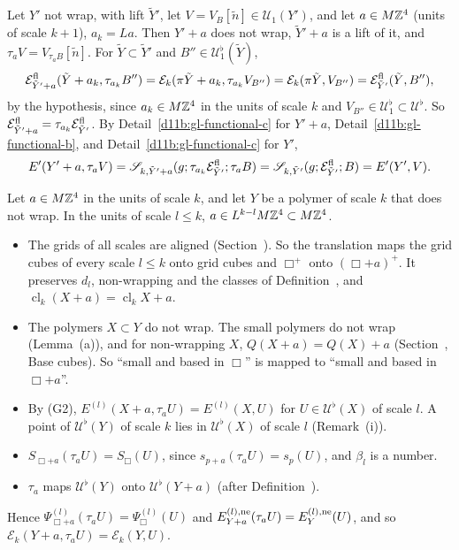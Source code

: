 \begin{step}
Let $Y'$ not wrap, with lift $\tilde Y'$, let $V=V_B[\tilde n]\in\mathcal U_1(Y')$, and let $a\in M\mathbb Z^4$ (units of scale $k+1$), $a_k=La$. Then $Y'+a$ does not wrap, $\tilde Y'+a$ is a lift of it, and $\tau_aV=V_{\tau_aB}[\tilde n]$. For $\tilde Y\subset\tilde Y'$ and $B''\in\mathcal U^\flat_1(\tilde Y)$,
\[
\mathcal E^{\rm fl}_{\tilde Y'+a}(\tilde Y+a_k,\tau_{a_k}B'')=\mathcal E_k(\pi\tilde Y+a_k,\tau_{a_k}V_{B''})=\mathcal E_k(\pi\tilde Y,V_{B''})=\mathcal E^{\rm fl}_{\tilde Y'}(\tilde Y,B''),
\]
by the hypothesis, since $a_k\in M\mathbb Z^4$ in the units of scale $k$ and $V_{B''}\in\mathcal U^\flat_1\subset\mathcal U^\flat$. So $\mathcal E^{\rm fl}_{\tilde Y'+a}=\tau_{a_k}\mathcal E^{\rm fl}_{\tilde Y'}$. By Detail~\ref{d11b:gl-functional-c} for $Y'+a$, Detail~\ref{d11b:gl-functional-b}, and Detail~\ref{d11b:gl-functional-c} for $Y'$,
\[
E'(Y'+a,\tau_aV)=\mathscr S_{k,\tilde Y'+a}(g;\tau_{a_k}\mathcal E^{\rm fl}_{\tilde Y'};\tau_aB)=\mathscr S_{k,\tilde Y'}(g;\mathcal E^{\rm fl}_{\tilde Y'};B)=E'(Y',V).
\]
\end{step}

\begin{step}
Let $a\in M\mathbb Z^4$ in the units of scale $k$, and let $Y$ be a polymer of scale $k$ that does not wrap. In the units of scale $l\le k$, $a\in L^{k-l}M\mathbb Z^4\subset M\mathbb Z^4$.
\begin{itemize}
\item The grids of all scales are aligned (Section~). So the translation maps the grid cubes of every scale $l\le k$ onto grid cubes and $\Box^+$ onto $(\Box+a)^+$. It preserves $d_l$, non-wrapping and the classes of Definition~, and $\operatorname{cl}_k(X+a)=\operatorname{cl}_kX+a$.
\item The polymers $X\subset Y$ do not wrap. The small polymers do not wrap (Lemma~(a)), and for non-wrapping $X$, $Q(X+a)=Q(X)+a$ (Section~, Base cubes). So ``small and based in $\Box$'' is mapped to ``small and based in $\Box+a$''.
\item By (G2), $E^{(l)}(X+a,\tau_aU)=E^{(l)}(X,U)$ for $U\in\mathcal U^\flat(X)$ of scale $l$. A point of $\mathcal U^\flat(Y)$ of scale $k$ lies in $\mathcal U^\flat(X)$ of scale $l$ (Remark~(i)).
\item $S_{\Box+a}(\tau_aU)=S_\Box(U)$, since $s_{p+a}(\tau_aU)=s_p(U)$, and $\beta_l$ is a number.
\item $\tau_a$ maps $\mathcal U^\flat(Y)$ onto $\mathcal U^\flat(Y+a)$ (after Definition~).
\end{itemize}
Hence $\Psi^{(l)}_{\Box+a}(\tau_aU)=\Psi^{(l)}_\Box(U)$ and $E^{(l),\rm ne}_{Y+a}(\tau_aU)=E^{(l),\rm ne}_Y(U)$, and so $\mathcal E_k(Y+a,\tau_aU)=\mathcal E_k(Y,U)$.
\end{step}

